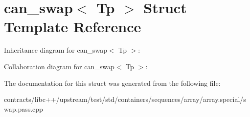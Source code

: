 \hypertarget{structcan__swap}{}\section{can\+\_\+swap$<$ Tp $>$ Struct Template Reference}
\label{structcan__swap}


Inheritance diagram for can\+\_\+swap$<$ Tp $>$\+:


Collaboration diagram for can\+\_\+swap$<$ Tp $>$\+:


The documentation for this struct was generated from the following file\+:\begin{DoxyCompactItemize}
\item 
contracts/libc++/upstream/test/std/containers/sequences/array/array.\+special/swap.\+pass.\+cpp\end{DoxyCompactItemize}
